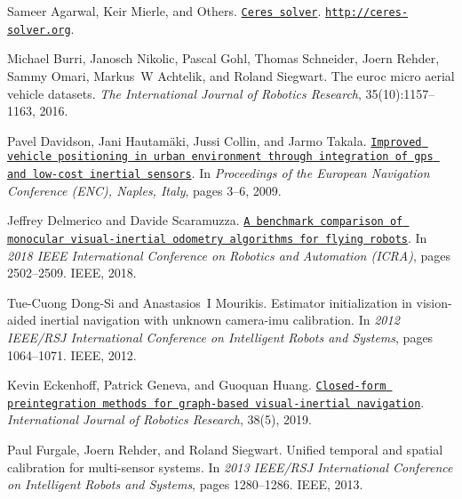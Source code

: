 
\begin{DoxyDescription}
\item[\label{_CITEREF_ceres-solver}%
\mbox{[}1\mbox{]}]Sameer Agarwal, Keir Mierle, and Others. \href{http://ceres-solver.org}{\tt Ceres solver}. \href{http://ceres-solver.org}{\tt http\+://ceres-\/solver.\+org}.


\item[\label{_CITEREF_Burri2016IJRR}%
\mbox{[}2\mbox{]}]Michael Burri, Janosch Nikolic, Pascal Gohl, Thomas Schneider, Joern Rehder, Sammy Omari, Markus~W Achtelik, and Roland Siegwart. The euroc micro aerial vehicle datasets. {\itshape The International Journal of Robotics Research}, 35(10)\+:1157--1163, 2016.


\item[\label{_CITEREF_Davidson2009ENC}%
\mbox{[}3\mbox{]}]Pavel Davidson, Jani Hautam\"{a}ki, Jussi Collin, and Jarmo Takala. \href{http://www.tkt.cs.tut.fi/research/nappo_files/1_C2.pdf}{\tt Improved vehicle positioning in urban environment through integration of gps and low-\/cost inertial sensors}. In {\itshape Proceedings of the European Navigation Conference (E\+NC), Naples, Italy}, pages 3--6, 2009.


\item[\label{_CITEREF_Delmerico2018ICRA}%
\mbox{[}4\mbox{]}]Jeffrey Delmerico and Davide Scaramuzza. \href{http://rpg.ifi.uzh.ch/docs/ICRA18_Delmerico.pdf}{\tt A benchmark comparison of monocular visual-\/inertial odometry algorithms for flying robots}. In {\itshape 2018 I\+E\+EE International Conference on Robotics and Automation (I\+C\+RA)}, pages 2502--2509. I\+E\+EE, 2018.


\item[\label{_CITEREF_Dong2012IROS}%
\mbox{[}5\mbox{]}]Tue-\/\+Cuong Dong-\/\+Si and Anastasios~I Mourikis. Estimator initialization in vision-\/aided inertial navigation with unknown camera-\/imu calibration. In {\itshape 2012 I\+E\+E\+E/\+R\+SJ International Conference on Intelligent Robots and Systems}, pages 1064--1071. I\+E\+EE, 2012.


\item[\label{_CITEREF_Eckenhoff2019IJRR}%
\mbox{[}6\mbox{]}]Kevin Eckenhoff, Patrick Geneva, and Guoquan Huang. \href{https://doi.org/10.1177/0278364919835021}{\tt Closed-\/form preintegration methods for graph-\/based visual-\/inertial navigation}. {\itshape International Journal of Robotics Research}, 38(5), 2019. 


\item[\label{_CITEREF_Furgale2013IROS}%
\mbox{[}7\mbox{]}]Paul Furgale, Joern Rehder, and Roland Siegwart. Unified temporal and spatial calibration for multi-\/sensor systems. In {\itshape 2013 I\+E\+E\+E/\+R\+SJ International Conference on Intelligent Robots and Systems}, pages 1280--1286. I\+E\+EE, 2013.



\end{DoxyDescription}
